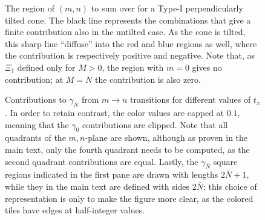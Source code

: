 \begin{figure}[ht]
  \centering
  \caption{The region of \( (m,n) \) to sum over for a Type-I perpendicularly tilted cone.
    The black line represents the combinations that give a finite contribution also in the untilted case.
    As the cone is tilted, this sharp line ``diffuse'' into the red and blue regions as well, where the contribution is respectively positive and negative.
    Note that, as \( \Xi_1 \) defined only for \( M>0\), the region with \( m=0 \) gives no contribution;
    at \( M=N \) the contribution is also zero.%
  }
  \label{fig:nmregion}
\end{figure}

\begin{figure}[htb]
  \centering
  
  \caption{Contributions to \( \gamma_{\bar{N}} \) from \( m\to n \) transitions for different values of \( t_x \).
    In order to retain contrast, the color values are capped at \( 0.1 \), meaning that the \( \gamma_0 \) contributions are clipped.
    Note that all quadrants of the \( m,n \)-plane are shown, although as proven in the main text, only the fourth quadrant needs to be computed, as the second quadrant contributions are equal.
    Lastly, the \( \gamma_{\bar{N}} \) square regions indicated in the first pane are drawn with lengths \( 2 \bar{N} + 1 \), while they in the main text are defined with sides \( 2 \bar{N} \);
    this choice of representation is only to make the figure more clear, as the colored tiles have edges at half-integer values.
    \label{fig:contribs}
    }
\end{figure}

